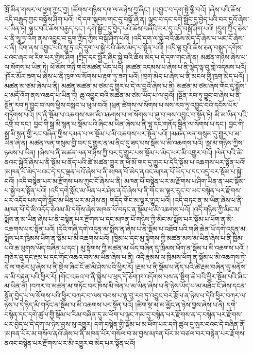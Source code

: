 ཁྲོ་མིན་གསར་ལ་ཕྱག་ཀྱང་བྱ། །ཚོགས་གཉིས་དག་ལ་མཉེས་བྱ་ཞིང་། །འབྱུང་བ་དག་སྟེ་ལྕི་བའོ། །ཞེས་པའི་ཆོས་འདི་བརྒྱད་ཀྱང་བསྒོས་ཤིག་པའོ། །དེ་དག་སྐབས་གང་དུ་བསྒོ་ཞེ་ན། ལྟུང་བ་དང་དགེ་སྦྱོང་དུ་བྱེད་པའི་བར་དུའོ་ཞེས་པ་ཡིན་ཏེ། ལྟུང་བའི་ཆོས་བརྒྱད་དང་། དགེ་སྦྱོང་དུ་བྱེད་པའི་ཆོས་བཞིའི་བར་དུ་འདི་བསྒོ་ཤིག་པའོ། །དྲུག་ཀྲིད་ཅེས་པ་ནི་སཱུ་ཏྲ་འོག་ནས་འབྱུང་བ་དྲུག་ཀྲིད་ཀྱིས་བསྒོ་ཤིག་པའོ། །འདི་དག་ལ་སྐྱེ་བའི་ཆོས་མེད་དོ་ཞེས་པ་ཡང་ངོ་ཞེས་པ་ནི། འོག་ནས་འབྱུང་པའི་སཱུ་ཏྲ་འདི་དྲུག་ལ་སྐྱེ་བའི་ཆོས་མེད་པ་སྟོན་པའོ། །འདི་ལྟ་བུའི་ཆོས་ཅན་བསྐྲད་དགོས་པའང་ཞར་ལ་རིག་པར་གྱིས་ཤིག །ཀྲིད་དང་སྦྱོར་ཞིང་སྐྱེ་བའི་ཆོས་མེད་པ་དེ་དག་གང་ཞེ་ན། མཚན་གཉིས་ཞེས་པ་ལ་སོགས་པ་ཡིན་ཏེ། ཕོ་མོས་གཉི་གའི་མཚན་ཡོད་པའོ། །མཚན་འདམས་པ་ཞེས་པ་ནི་ལྷེད་ལྟ་བུ་གླེ་འདམས་པའོ། །ཁོར་མོར་ཟག་པ་ཞེས་པ་ནི་ཁྲག་ལ་སོགས་པ་རྟག་ཏུ་ཟག་པའོ། །ཁྲག་མེད་པ་ཞེས་པ་ནི་མངལ་གྱི་ཁྲག་མེད་པའོ། །མཚན་མ་ཙམ་ཞེས་པ་ནི། མཚན་མཚན་མ་ཙམ་དུ་གྱུར་པ་དེ་ལ་བྱའོ་ཞེས་པ་ནི། མཚན་མ་ཙམ་ཞེས་གོང་དུ་སྨོས་པ་མདོ་འོག་ནས་འཆད་པ་ཡིན་ཏེ། ཆུ་འབྱུང་བའི་མཚན་མ་ཙམ་ཡོད་པ་ལ་བྱའོ། །སྔོན་རབ་ཏུ་བྱུང་བ་ཞེས་པ་ནི་སྔོན་རབ་ཏུ་བྱུང་བ་ལས་ཕྱིས་བསླབ་པ་ཕུལ་བའོ། །ཕྲན་ཚེགས་ལ་སོགས་པ་ལས་རབ་ཏུ་འབྱུང་བའི་དངོས་པོར་གཏོགས་པའོ། །ད་ནི་སྡོམ་པ་འཆགས་སམ་མི་འཆགས་པ་ལ་སོགས་པ་ཞུ་བ་ལས་འབྱུང་བ་སྟོན་ཏེ། མི་མ་ཡིན་པའི་འགྲོ་བ་དང་། བྱང་གི་སྒྲ་མི་སྙན་པ་སྡོམ་པའི་ཞིང་མ་ཡིན་ཞེས་པ་ནི་ལྷ་དང་གནོད་སྦྱིན་ལ་སོགས་པ་དང་། བྱང་གི་སྒྲ་མི་སྙན་གྱི་རང་བཞིན་གྱིས་དམན་པ་ལ་སྡོམ་པ་མི་འཆགས་པར་སྟོན་པའོ། །མཚན་ལན་གསུམ་དུ་གྱུར་པ་མ་ཡིན་ཞེ་ན། མཚན་ལན་གསུམ་གྱི་བར་དུ་གྱུར་ན་མ་ནིང་དུ་ཟད་པས་སྡོམ་པ་མི་འཆགས་པའོ། །སྔ་མ་གཉིས་ཀྱིས་ཉམས་པ་ཡིན། །ཞེས་པ་ནི་མཚན་ལན་གཉིས་ཀྱི་བར་དུ་གྱུར་པས་སྡོམ་པ་མེད་པར་མི་འགྱུར་བའོ། །ལེན་པའི་ཚེ་ནའང་སྐྱེའོ་ཞེས་པ་ནི་སྡོམ་པ་ནོད་པའི་ཚེ་མཚན་གྱུར་ན་ཕོ་མོ་གང་དུ་གྱུར་པ་དེའི་སྡོམ་པ་འཆགས་པར་སྟོན་པའོ། །མཁན་པོ་མེད་པའང་དེ་དང་ལྡན་པའོ་ཞེས་པ་ནི་མཁན་པོ་མེད་ནའང་མཁན་པོ་ཡོད་པ་དང་འདྲ་བར་སྡོམ་པ་སྐྱེ་བའོ། །འདི་བསྙེན་པར་མ་རྫོགས་པས་ཀྱང་ངོ་ཞེས་པ་ནི། མཁན་པོ་བསྙེན་པར་མ་རྫོགས་པ་ཤིག་ཡིན་ན་ཡང་སྡོམ་པ་སྐྱེ་བར་སྟོན་པའོ། །འདི་དགེ་སློང་མ་ཡིན་པར་ཤེས་ནའོ་ཞེས་པ་ནི་གོང་མ་ལྟར་རུང་བ་ཡང་བསྙེན་པར་རྫོགས་པར་འདོད་པས་དགེ་སློང་མ་ཡིན་པར་མ་ཤེས་ན། གདོད་གོང་མ་ལྟར་གྱུར་པའོ། །འདི་བཏང་ན་མ་ཡིན་ཞེས་པ་ནི་མཁན་པོ་དེ་མི་འདོད་ཅེའམ་མི་དགོས་ཞེས་མཁན་པོ་བཏང་ན་སྡོམ་པ་མི་འཆགས་པའོ། །འདི་གཉིས་ཀྱི་མིང་མ་སྨོས་ན་མ་ཡིན་ཞེས་པ་ནི་བསྙེན་པར་རྫོགས་པ་དང་མཁན་པོ་གཉིས་ཀྱི་མིང་མ་སྨོས་པར་སྡོམ་པ་ཕོག་ན་མི་འཆགས་པར་སྟོན་པའོ། །དེའི་གཞི་དགེ་འདུན་མ་སྨོས་ན་ཞེས་པ་ནི་སྡོམ་པ་འཐོབ་པའི་གཞི་ཆེན་པོ་དགེ་འདུན་མ་སྨོས་པར་ཁྲིམས་ཕོག་ན་སྡོམ་པ་མི་འཆགས་པའོ། །ཁྱིམ་པ་དང་མུ་སྟེགས་ཀྱི་མཚན་མས་མ་ཡིན་ཞེས་པ་ནི་ཁྱིམ་པའི་ཆ་ལུགས་ཡོད་བཞིན་པ་དང་། མུ་སྟེགས་ཀྱི་མཚན་མ་ཡོད་བཞིན་དུ་ཁྲིམས་ཕོག་ན་སྡོམ་པ་མི་འཆགས་པའོ། །གཅེར་བུ་དང་རྔམ་པ་དང་གོང་འཆའ་བས་མ་ཡིན་ཞེས་པ་ནི། འདི་རྣམས་ལ་ཁྲིམས་ཕོག་ན་སྡོམ་པ་མི་འཆགས་ཏེ་དེ་ལ་གཅེར་པུ་ཞེས་པ་ནི་ཁྲེལ་ཞིང་ངོ་ཚ་མི་ཤེས་པའི་ཕྱིར་རོ། །རྔམ་པ་ནི་སྡོམ་པ་ནོད་པའི་ཚེ་རྔམ་བཞིན་དུ་མནོས་ན་མི་བརྟན་པའི་ཕྱིར་རོ། །གོང་འཆའ་བ་ནི་སྐྱེས་པ་ཕྲད་དོ་ཅོག་ཁ་འདོགས་པས་ན་སྡིག་ཆེ་བའི་ཕྱིར་སྡོམ་པའི་ཞིང་མ་ཡིན་ནོ། །བཀར་བ་མཚན་མ་གཏོང་བར་ཁས་མི་ལེན་པ་མ་ཡིན་ཞེས་པ་ནི་ཉེས་ཡོད་པ་མ་མཐོང་ངོ་ཞེས་དངན་སྙོན་བྱེད་པ་ལ་སོགས་པའི་ཕྱིར་བཀར་བ་ལས་བབས་པ་ལྟ་བུ་རབ་ཏུ་འབྱུང་བར་རྩོལ་ན་ཉེས་པ་དེའི་ཕྱིར་བཀར་ལ་ཉེས་པ་དེ་ཉིད་མི་གཏོང་ན་སྡོམ་པ་མི་འཆགས་པར་སྟོན་པའོ། །ཚིག་སྔ་མ་མ་མྱོང་ན་ཉེས་བྱས་ཞེས་པ་ནི། དགེ་བསྙེན་དང་དགེ་ཚུལ་གྱི་སྡོམ་པ་རིམ་བཞིན་དུ་མ་ཕོག་པ་ལྟང་ཀམ་དུ་བསྙེན་པར་རྫོགས་ན་ད་བསྙེན་པར་རྫོགས་པར་བྱེད་པ་དེ་དག་ལ་ཉེས་བྱས་སུ་འགྱུར། དགེ་བསྙེན་གྱི་སྡོམ་པ་མ་ཕོག་པར་དགེ་ཚུལ་དུ་སྤར་བའང་དེ་བཞིན་ནོ། །མཁན་པོར་མ་གསོལ་ནའོ་ཞེས་པ་ནི་མཁན་པོར་གསོལ་བ་མ་བྱས་མཁན་པོར་མ་བཙལ་བར་བསྙེན་པར་རྫོགས་ནའང་བསྙེན་པར་རྫོགས་པར་མི་འགྱུར་བ་མེད་པར་སྟོན་པའོ། 